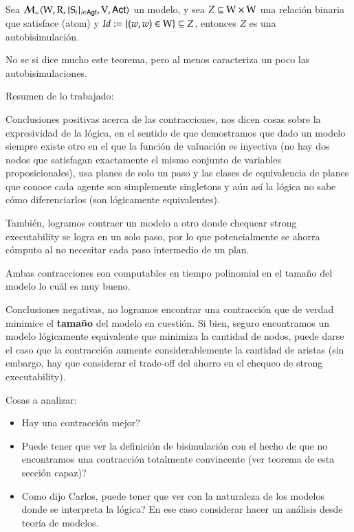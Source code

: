 \begin{teorema}
    Sea $\mathcal{M}_=\langle \mathrm{W},\mathrm{R},\{ \mathrm{S}_i \}_{i \in {\rm \sf Agt}},\mathrm{V},{\rm \sf Act} \rangle$ un modelo, y sea $Z \subseteq \mathrm{W} \times \mathrm{W}$ una relación binaria que satisface (atom) y $Id := \{(w,w)\in \mathrm{W}\} \subseteq Z$, entonces $Z$ es una autobisimulación.
\end{teorema}

No se si dice mucho este teorema, pero al menos caracteriza un poco las autobisimulaciones.

Resumen de lo trabajado:

Conclusiones positivas acerca de las contracciones, nos dicen cosas sobre la expresividad de la lógica, en el sentido de que demostramos que dado un modelo siempre existe otro en el que la función de valuación es inyectiva (no hay dos nodos que satisfagan exactamente el mismo conjunto de variables proposicionales), usa planes de solo un paso y las clases de equivalencia de planes que conoce cada agente son simplemente singletons y aún así la lógica no sabe cómo diferenciarlos (son lógicamente equivalentes).

También, logramos contraer un modelo a otro donde chequear strong executability se logra en un solo paso, por lo que potencialmente se ahorra cómputo al no necesitar cada paso intermedio de un plan.

Ambas contracciones son computables en tiempo polinomial en el tamaño del modelo lo cuál es muy bueno.


Conclusiones negativas, no logramos encontrar una contracción que de verdad minimice el \rm\textbf{tamaño} del modelo en cuestión. Si bien, seguro encontramos un modelo lógicamente equivalente que minimiza la cantidad de nodos, puede darse el caso que la contracción aumente considerablemente la cantidad de aristas (sin embargo, hay que considerar el trade-off del ahorro en el chequeo de strong executability).

Cosas a analizar: 
\begin{itemize}
    \item Hay una contracción mejor?
    \item Puede tener que ver la definición de bisimulación con el hecho de que no encontramos una contracción totalmente convincente (ver teorema de esta sección capaz)? 
    \item Como dijo Carlos, puede tener que ver con la naturaleza de los modelos donde se interpreta la lógica? En ese caso considerar hacer un análisis desde teoría de modelos.
\end{itemize}
